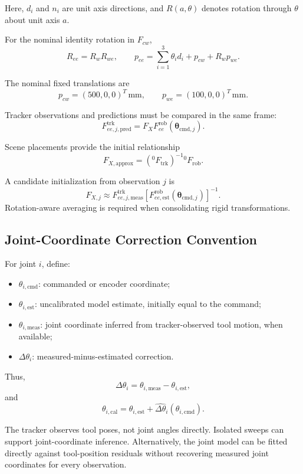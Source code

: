 \documentclass[11pt,letterpaper]{article}
\begin{document}
Here, $d_i$ and $n_i$ are unit axis directions,
and $R(a,\theta)$ denotes rotation through $\theta$
about unit axis $a$.

For the nominal identity rotation in $F_{cw}$,
\[
R_{ee}=R_wR_{we},
\qquad
p_{ee}=
\sum_{i=1}^{3}\theta_i d_i+p_{cw}+R_wp_{we}.
\]

The nominal fixed translations are
\[
p_{cw}=(500,0,0)^T\,\mathrm{mm},
\qquad
p_{we}=(100,0,0)^T\,\mathrm{mm}.
\]

Tracker observations and predictions must be compared
in the same frame:
\[
F_{ee,j,\mathrm{pred}}^{\mathrm{trk}}
=
F_XF_{ee}^{\mathrm{rob}}
(\boldsymbol{\theta}_{\mathrm{cmd},j}).
\]

Scene placements provide the initial relationship
\[
F_{X,\mathrm{approx}}
=
\left({}^{0}F_{\mathrm{trk}}\right)^{-1}
{}^{0}F_{\mathrm{rob}}.
\]

A candidate initialization from observation $j$ is
\[
F_{X,j}
\approx
F_{ee,j,\mathrm{meas}}^{\mathrm{trk}}
\left[
F_{ee,\mathrm{est}}^{\mathrm{rob}}
(\boldsymbol{\theta}_{\mathrm{cmd},j})
\right]^{-1}.
\]
Rotation-aware averaging is required when
consolidating rigid transformations.

\subsection{Joint-Coordinate Correction Convention}

For joint $i$, define:
\begin{itemize}
\item $\theta_{i,\mathrm{cmd}}$:
commanded or encoder coordinate;
\item $\theta_{i,\mathrm{est}}$:
uncalibrated model estimate, initially equal
to the command;
\item $\theta_{i,\mathrm{meas}}$:
joint coordinate inferred from tracker-observed
tool motion, when available;
\item $\Delta\theta_i$:
measured-minus-estimated correction.
\end{itemize}

Thus,
\[
\Delta\theta_i
=
\theta_{i,\mathrm{meas}}
-
\theta_{i,\mathrm{est}},
\]
and
\[
\theta_{i,\mathrm{cal}}
=
\theta_{i,\mathrm{est}}
+
\widehat{\Delta\theta}_i
(\theta_{i,\mathrm{cmd}}).
\]

The tracker observes tool poses, not joint angles
directly. Isolated sweeps can support joint-coordinate
inference. Alternatively, the joint model can be
fitted directly against tool-position residuals without
recovering measured joint coordinates for every
observation.
\end{document}
